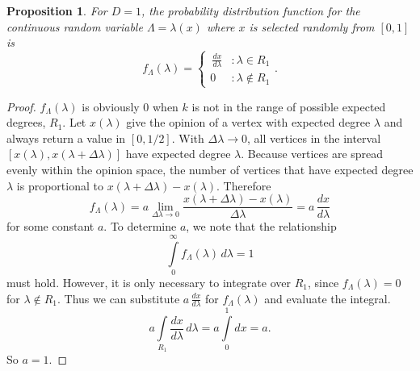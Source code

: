 \documentclass[a4paper,10pt]{article}
\newtheorem{prop}{Proposition}
\begin{document}
\begin{prop}
 For $D=1$, the probability distribution function for the continuous random variable $\Lambda = \lambda(x)$ where $x$ is selected randomly from $[0, 1]$ is
 \begin{equation}
 f_\Lambda(\lambda) = \left\{
     \begin{array}{lr}
  \,\frac{dx}{d\lambda} & : \lambda \in R_1 \\
  0 & : \lambda \notin R_1
     \end{array}
   \right..
\end{equation}
\end{prop}
\begin{proof}
$f_\Lambda(\lambda)$ is obviously 0 when $k$ is not in the range of possible expected degrees, $R_1$. Let $x(\lambda)$ give the opinion of a vertex with expected degree $\lambda$ and always return a value in $[0, 1/2]$. With $\Delta \lambda \to 0$, all vertices in the interval $[x(\lambda), x(\lambda + \Delta \lambda)]$ have expected degree $\lambda$. Because vertices are spread evenly within the opinion space, the number of vertices that have expected degree $\lambda$ is proportional to $x(\lambda + \Delta \lambda) - x(\lambda)$. Therefore
\begin{equation}
 f_\Lambda(\lambda) = a \lim\limits_{\Delta \lambda \to 0} \frac{x(\lambda + \Delta \lambda) - x(\lambda)}{\Delta \lambda} = a \, \frac{dx}{d\lambda}
\end{equation}
for some constant $a$. To determine $a$, we note that the relationship 
\begin{equation}
 \int\limits_{0}^\infty f_\Lambda(\lambda)\, d\lambda = 1
\end{equation}
must hold. However, it is only necessary to integrate over $R_1$, since $f_\Lambda(\lambda) = 0$ for $\lambda \notin R_1$. Thus we can substitute $a \, \frac{dx}{d\lambda}$ for $f_\Lambda(\lambda)$ and evaluate the integral.
\begin{equation}
 a\int\limits_{R_1} \frac{dx}{d\lambda} \, d\lambda = a\int\limits_{0}^1 dx = a.
\end{equation}
So $a = 1$.
\end{proof}
\end{document}

